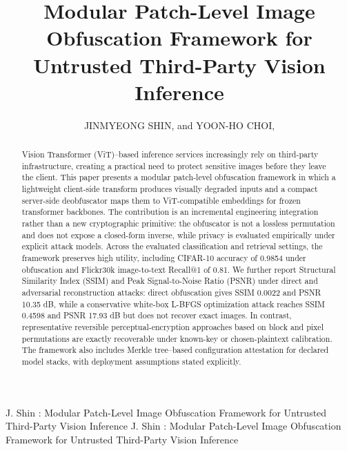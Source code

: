 \documentclass{ieeeaccess}
\newcommand{\rev}[1]{{\color{black}#1}}
\begin{document}

\title{Modular Patch-Level Image Obfuscation Framework for Untrusted Third-Party Vision Inference}
\author{\uppercase{Jinmyeong Shin}, and
\uppercase{Yoon-Ho Choi},}

\address[1]{Cloud Security Research Center, Pusan National University, Busan 46241, Republic of Korea}
\address[2]{School of Computer Science and Engineering, Pusan National University, Busan 46241, Republic of Korea}

\markboth
{J. Shin \headeretal: Modular Patch-Level Image Obfuscation Framework for Untrusted Third-Party Vision Inference}
{J. Shin \headeretal: Modular Patch-Level Image Obfuscation Framework for Untrusted Third-Party Vision Inference}



\begin{abstract}
\rev{Vision Transformer (ViT)--based inference services increasingly rely on third-party infrastructure, creating a practical need to protect sensitive images before they leave the client. This paper presents a modular patch-level obfuscation framework in which a lightweight client-side transform produces visually degraded inputs and a compact server-side deobfuscator maps them to ViT-compatible embeddings for frozen transformer backbones. The contribution is an incremental engineering integration rather than a new cryptographic primitive: the obfuscator is not a lossless permutation and does not expose a closed-form inverse, while privacy is evaluated empirically under explicit attack models. Across the evaluated classification and retrieval settings, the framework preserves high utility, including CIFAR-10 accuracy of 0.9854 under obfuscation and Flickr30k image-to-text Recall@1 of 0.81. We further report Structural Similarity Index (SSIM) and Peak Signal-to-Noise Ratio (PSNR) under direct and adversarial reconstruction attacks: direct obfuscation gives SSIM 0.0022 and PSNR 10.35 dB, while a conservative white-box L-BFGS optimization attack reaches SSIM 0.4598 and PSNR 17.93 dB but does not recover exact images. In contrast, representative reversible perceptual-encryption approaches based on block and pixel permutations are exactly recoverable under known-key or chosen-plaintext calibration. The framework also includes Merkle tree--based configuration attestation for declared model stacks, with deployment assumptions stated explicitly.}
\end{abstract}
\end{document}
